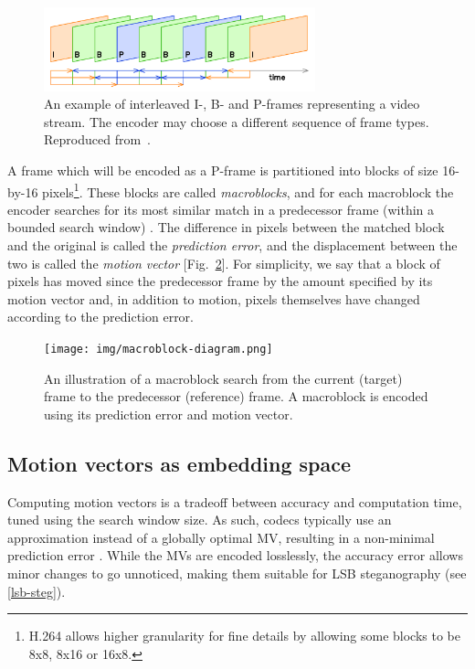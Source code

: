 \documentclass[12pt,british,twoside,notitlepage,usenames,dvipsnames,hypens,final]{report}
\numberwithin{equation}{section}
\numberwithin{figure}{section}
\begin{document}
\begin{figure}[tbh]
\centerline{\includegraphics[width=0.7\textwidth, height=0.7\textheight, keepaspectratio]{img/IPB_images_sequence.png}}
\caption{An example of interleaved I-, B- and P-frames representing a video stream. The encoder may choose a different sequence of frame types. Reproduced from~\cite{interframe-wiki}.}
\label{fig:ipb-seq}
\end{figure}

A frame which will be encoded as a P-frame is partitioned into blocks of size 16-by-16 pixels\footnote{H.264 allows higher granularity for fine details by allowing some blocks to be 8x8, 8x16 or 16x8.}. These blocks are called \emph{macroblocks}, and for each macroblock the encoder searches for its most similar match in a predecessor frame (within a bounded search window) \cite[p.~256]{richardson2004h}. The difference in pixels between the matched block and the original is called the \emph{prediction error}, and the displacement between the two is called the \emph{motion vector} [Fig.~\ref{fig:mb-search}]. For simplicity, we say that a block of pixels has moved since the predecessor frame by the amount specified by its motion vector and, in addition to motion, pixels themselves have changed according to the prediction error.

\begin{figure}[tbh]
\centerline{\texttt{[image: img/macroblock-diagram.png]}}
\caption{An illustration of a macroblock search from the current (target) frame to the predecessor (reference) frame. A macroblock is encoded using its prediction error and  motion vector.}
\label{fig:mb-search}
\end{figure} 

\subsection{Motion vectors as embedding space}
\label{mv-emb-space}

Computing motion vectors is a tradeoff between accuracy and computation time, tuned using the search window size. As such, codecs typically use an approximation instead of a globally optimal MV, resulting in a non-minimal prediction error \cite[p.~257]{richardson2004h}. While the MVs are encoded losslessly, the accuracy error allows minor changes to go unnoticed, making them suitable for LSB steganography (see \ref{lsb-steg}).
\end{document}
